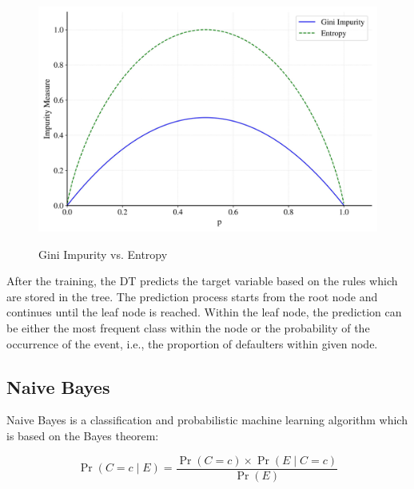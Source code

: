 \begin{figure}[H]
    \centering
    \caption{Gini Impurity vs. Entropy}\vspace{0.5em}
    \label{fig:impurity}\
    \includegraphics[width=130mm]{Figures/impurity.jpg}
    \vspace{-1em}
\end{figure}

After the training, the DT predicts the target variable based on the rules which are stored in the tree.
The prediction process starts from the root node and continues until the leaf node is reached. Within the leaf node, the prediction can be either the most frequent class within the node or the probability of the occurrence of the event, i.e., the proportion of defaulters within given node.

\subsection{Naive Bayes}

Naive Bayes is a classification and probabilistic machine learning algorithm which is based on the Bayes theorem:

\begin{equation}\label{eq}
    \operatorname{Pr}\left(C=c \mid E \right) = \frac{\operatorname{Pr}\left(C=c\right) \times \operatorname{Pr}\left(E \mid C=c\right)}{\operatorname{Pr}\left(E\right)}
\end{equation}

